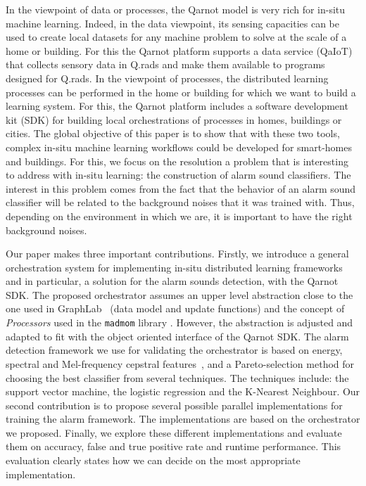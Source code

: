 \documentclass[10pt, conference, compsocconf]{IEEEtran}
\begin{document}
In the viewpoint of data or processes, the Qarnot model is very rich for in-situ machine learning. Indeed, in the data viewpoint, 
its sensing capacities can be used to create local datasets for any machine problem to solve at the scale of a home or building. 
For this the Qarnot platform supports a data service (QaIoT) that collects sensory data in Q.rads 
and make them available to programs designed for Q.rads. 
In the viewpoint of processes, the distributed learning processes can be performed in the home or building for which we want to 
build a learning system. For this, the Qarnot platform includes a software development kit (SDK) for building local orchestrations 
of processes in homes, buildings or cities.
The global objective of this paper is to show that with these two tools, 
complex in-situ machine learning workflows could be developed for smart-homes and buildings. For this, we focus on the resolution 
a problem that is interesting to address with in-situ learning: the construction of alarm sound classifiers. 
The interest in this problem comes from the fact that the behavior of an alarm sound classifier will be related to the background noises that 
it was trained with. Thus, depending on the environment in which we are, it is important to have the right background noises.

Our paper makes three important contributions. Firstly, we introduce a general orchestration system for implementing in-situ 
distributed learning frameworks and in particular, a solution for the alarm sounds detection, with the Qarnot SDK. 
The proposed orchestrator assumes an upper level abstraction close to the one used in GraphLab~\cite{Low:2012:DGF:2212351.2212354} (data model 
and update functions) and the concept of {\it Processors} used in the \texttt{madmom} library \cite{DBLP:journals/corr/BockKSKW16}. However, the abstraction is adjusted and adapted to fit with the object oriented interface 
of the Qarnot SDK. 
The alarm detection framework we use for validating the orchestrator is based on energy, spectral and Mel-frequency cepstral features~\cite{Davis:1990:CPR:108235.108239}, \cite{pyAudioAnalysis}
and a Pareto-selection method for choosing the best classifier from several techniques. %
The techniques include: the support vector machine, the logistic regression and the K-Nearest Neighbour. Our second contribution is to propose several possible parallel %
implementations for training the alarm framework. The implementations are based on the orchestrator we proposed.  
Finally, we explore these different implementations and evaluate them on accuracy, 
false and true positive rate and runtime performance. This evaluation clearly states how we can decide on the most appropriate 
implementation. %
\end{document}
